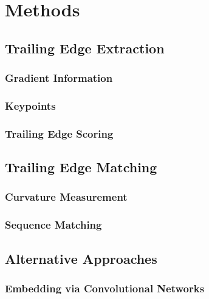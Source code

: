   
\chapter{Methods} \label{sec:methods}

\section{Trailing Edge Extraction}

\subsection{Gradient Information}

\subsection{Keypoints}

\subsection{Trailing Edge Scoring}

\section{Trailing Edge Matching}

\subsection{Curvature Measurement}

\subsection{Sequence Matching}

\section{Alternative Approaches}

\subsection{Embedding via Convolutional Networks}

